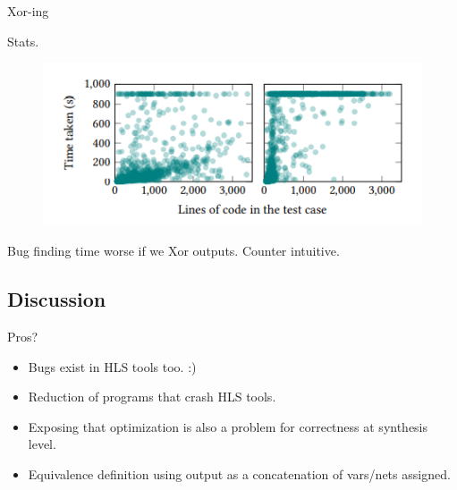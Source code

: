 \documentclass[notes, xcolor=dvipsnames]{beamer}
\begin{document}
    \begin{frame}{Xor-ing }
        
        Stats. 
        \begin{figure}
            \includegraphics{Concat_vs_Xor.PNG}
        \end{figure}
        Bug finding time  worse if we Xor outputs. 
        Counter intuitive.

    \end{frame}


    \subsection{Discussion}
    \begin{frame}{Pros?}
        
        \begin{itemize}
            \item Bugs exist in HLS tools too. :)
            \item Reduction of programs that crash HLS tools. 
            \item Exposing that optimization is also a problem for correctness at synthesis level. 
            \item Equivalence definition using output as a concatenation of vars/nets assigned. 
        \end{itemize}

    \end{frame}
\end{document}
